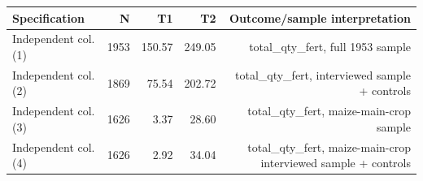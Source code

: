 \begin{tabular}{lrrrr}
\hline
Specification & N & T1 & T2 & Outcome/sample interpretation \\
\hline
Independent col. (1) & 1953 & 150.57 & 249.05 & total_qty_fert, full 1953 sample \\
Independent col. (2) & 1869 & 75.54 & 202.72 & total_qty_fert, interviewed sample + controls \\
Independent col. (3) & 1626 & 3.37 & 28.60 & total_qty_fert, maize-main-crop sample \\
Independent col. (4) & 1626 & 2.92 & 34.04 & total_qty_fert, maize-main-crop interviewed sample + controls \\
\hline
\end{tabular}
